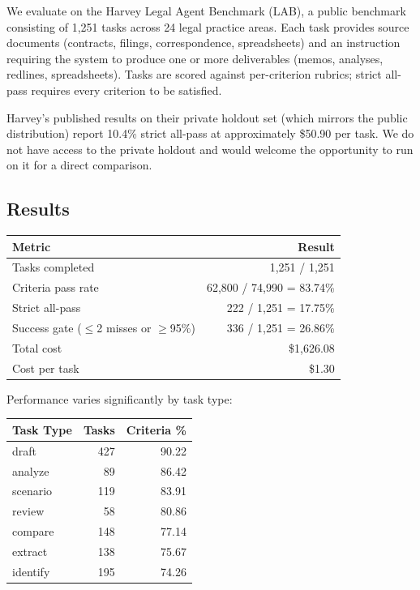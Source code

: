 \documentclass[11pt,a4paper]{article}
\begin{document}
We evaluate on the Harvey Legal Agent Benchmark (LAB), a public benchmark consisting of 1,251 tasks across 24 legal practice areas. Each task provides source documents (contracts, filings, correspondence, spreadsheets) and an instruction requiring the system to produce one or more deliverables (memos, analyses, redlines, spreadsheets). Tasks are scored against per-criterion rubrics; strict all-pass requires every criterion to be satisfied.

Harvey's published results on their private holdout set (which mirrors the public distribution) report 10.4\% strict all-pass at approximately \$50.90 per task. We do not have access to the private holdout and would welcome the opportunity to run on it for a direct comparison.

\subsection{Results}

\begin{center}
\begin{tabular}{lr}
\toprule
\textbf{Metric} & \textbf{Result} \\
\midrule
Tasks completed & 1,251 / 1,251 \\
Criteria pass rate & 62,800 / 74,990 = 83.74\% \\
Strict all-pass & 222 / 1,251 = 17.75\% \\
Success gate ($\leq$2 misses or $\geq$95\%) & 336 / 1,251 = 26.86\% \\
Total cost & \$1,626.08 \\
Cost per task & \$1.30 \\
\bottomrule
\end{tabular}
\end{center}

\vspace{0.5em}

Performance varies significantly by task type:

\begin{center}
\begin{tabular}{lrr}
\toprule
\textbf{Task Type} & \textbf{Tasks} & \textbf{Criteria \%} \\
\midrule
draft & 427 & 90.22 \\
analyze & 89 & 86.42 \\
scenario & 119 & 83.91 \\
review & 58 & 80.86 \\
compare & 148 & 77.14 \\
extract & 138 & 75.67 \\
identify & 195 & 74.26 \\
\bottomrule
\end{tabular}
\end{center}
\end{document}
